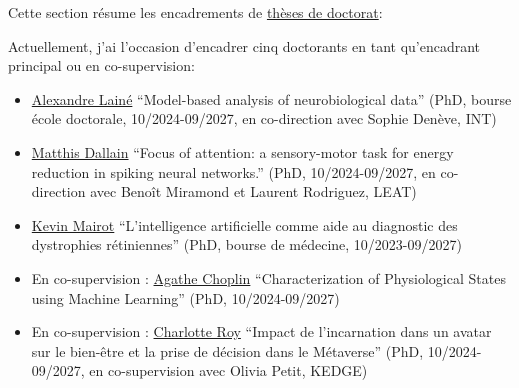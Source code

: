\documentclass[10pt,french,a4paper]{article}%
\begin{document}
Cette section résume les encadrements de \href{https://www.theses.fr/074493701}{thèses de doctorat}:

Actuellement, j'ai l'occasion d'encadrer cinq doctorants %
en tant qu'encadrant principal ou en co-supervision:

\begin{itemize}
	\item \href{https://laurentperrinet.github.io/author/alexandre-lain%C3%A9/}{Alexandre Lainé} ``Model-based analysis of neurobiological data'' (PhD, bourse école doctorale, 10/2024-09/2027, en co-direction avec Sophie Denève, INT)
	\item \href{https://laurentperrinet.github.io/author/matthis-dallain/}{Matthis Dallain} ``Focus of attention: a sensory-motor task for energy reduction in spiking neural networks.'' (PhD, 10/2024-09/2027, en co-direction avec Benoît Miramond et Laurent Rodriguez, LEAT)
	\item \href{https://laurentperrinet.github.io/author/kevin-mairot/}{Kevin Mairot} ``L’intelligence artificielle comme aide au diagnostic des dystrophies rétiniennes'' (PhD, bourse de médecine, 10/2023-09/2027)
	\item En co-supervision : \href{https://laurentperrinet.github.io/author/agathe-choplin/}{Agathe Choplin} ``Characterization of Physiological States using Machine Learning'' (PhD, 10/2024-09/2027)
	\item En co-supervision : \href{https://laurentperrinet.github.io/author/charlotte-roy/}{Charlotte Roy} ``Impact de l'incarnation dans un avatar sur le bien-être et la prise de décision dans le Métaverse'' (PhD, 10/2024-09/2027, en co-supervision avec Olivia Petit, KEDGE)
\end{itemize}
\end{document}
